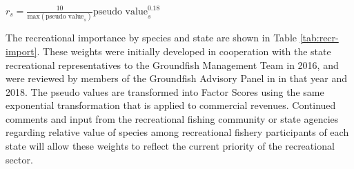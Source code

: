 \documentclass[11pt,
  english,
  a4paper,
]{article}
\begin{document}
\begin{centering}

$r_s = \frac{10}{\text{max}(\text{pseudo value}_s)}\text{pseudo value}_s^{0.18}$  

\end{centering}


The recreational importance by species and state are shown in Table \ref{tab:recr-import}. These weights were initially developed in cooperation with the state recreational representatives to the Groundfish Management Team in 2016, and were reviewed by members of the Groundfish Advisory Panel in in that year and 2018. The pseudo values are transformed into Factor Scores using the same exponential transformation that is applied to commercial revenues. Continued comments and input from the recreational fishing community or state agencies regarding relative value of species among recreational fishery participants of each state will allow these weights to reflect the current priority of the recreational sector.

\leavevmode\tagmcend\tagstructend\par

\begingroup\fontsize{10}{12}\selectfont
\begingroup\fontsize{10}{12}\selectfont
\end{document}
